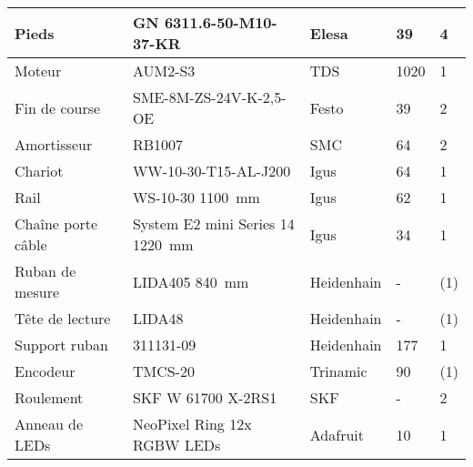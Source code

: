 \begin{table}[H]
{\begin{tabular}{|l|l|l|l|l|}
            Pieds                  & GN 6311.6-50-M10-37-KR           & Elesa \cite{Elesa}              & 39                         & 4                 \\ \hline
            Moteur                 & AUM2-S3                          & TDS \cite{TDSPrecisionProducts} & 1020                       & 1                 \\ \hline
            Fin de course          & SME-8M-ZS-24V-K-2,5-OE           & Festo \cite{Festo}              & 39                         & 2                 \\ \hline
            Amortisseur            & RB1007                           & SMC \cite{SMC}                  & 64                         & 2                 \\ \hline
            Chariot                & WW-10-30-T15-AL-J200             & Igus \cite{Igus}                & 64                         & 1                 \\ \hline
            Rail                   & WS-10-30 1100~mm                 & Igus \cite{Igus}                & 62                         & 1                 \\ \hline
            Chaîne porte câble     & System E2 mini Series 14 1220~mm & Igus \cite{Igus}                & 34                         & 1                 \\ \hline
            Ruban de mesure        & LIDA405 840~mm                   & Heidenhain \cite{Heidenhain}    & -                          & (1)               \\ \hline
            Tête de lecture        & LIDA48                           & Heidenhain \cite{Heidenhain}    & -                          & (1)               \\ \hline
            Support ruban          & 311131-09                        & Heidenhain \cite{Heidenhain}    & 177                        & 1                 \\ \hline
            Encodeur               & TMCS-20                          & Trinamic \cite{Trinamic}        & 90                         & (1)               \\ \hline
            Roulement              & SKF W 61700 X-2RS1               & SKF \cite{SKF}                  & -                          & 2                 \\ \hline
            Anneau de LEDs         & NeoPixel Ring 12x RGBW LEDs      & Adafruit \cite{Adafruit}        & 10                         & 1                 \\ \hline

\end{tabular}}
\end{table}

